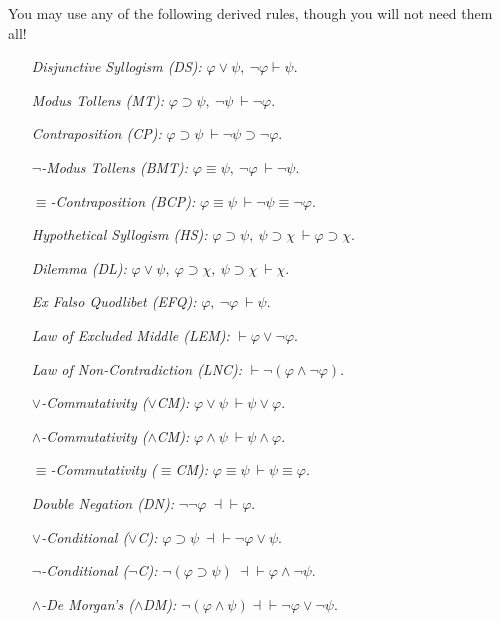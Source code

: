 \documentclass[12pt]{article}
\begin{document}
\noindent
You may use any of the following derived rules, though you will not need them all!

\bigskip

\begin{enumerate}[leftmargin=2.75in]
  \item[\it Disjunctive Syllogism \textsc{(DS):}] $\varphi \vee \psi,\ \neg \varphi \vdash \psi$.
  \item[\it Modus Tollens \textsc{(MT):}] $\varphi \supset \psi,\ \neg\psi\ \vdash \neg\varphi$.
  \item[\it Contraposition \textsc{(CP):}] $\varphi \supset \psi\ \vdash \neg\psi \supset \neg\varphi$.
  \item[\it $\neg$-Modus Tollens \textsc{(BMT):}] $\varphi \equiv \psi,\ \neg\varphi\ \vdash \neg\psi$.
  \item[\it $\equiv$-Contraposition \textsc{(BCP):}] $\varphi \equiv \psi\ \vdash \neg\psi \equiv \neg\varphi$.
  \item[\it Hypothetical Syllogism \textsc{(HS):}] $\varphi \supset \psi,\ \psi \supset \chi\ \vdash \varphi \supset \chi$.
  \item[\it Dilemma \textsc{(DL):}] $\varphi \vee \psi,\ \varphi \supset \chi,\ \psi \supset \chi\ \vdash \chi$.
  \item[\it Ex Falso Quodlibet \textsc{(EFQ):}] $\varphi,\ \neg\varphi\ \vdash \psi$.
  \item[\it Law of Excluded Middle \textsc{(LEM):}] $\vdash \varphi\vee\neg\varphi$.
  \item[\it Law of Non-Contradiction \textsc{(LNC):}] $\vdash \neg(\varphi\wedge\neg\varphi)$.
  \item[\it $\vee$-Commutativity \textsc{($\vee$CM):}] $\varphi \vee \psi\ \vdash \psi \vee \varphi$.
  \item[\it $\wedge$-Commutativity \textsc{($\wedge$CM):}] $\varphi \wedge \psi\ \vdash \psi \wedge \varphi$.
  \item[\it $\equiv$-Commutativity \textsc{($\equiv$CM):}] $\varphi \equiv \psi\ \vdash \psi \equiv \varphi$.
  \item[\it Double Negation \textsc{(DN):}] $\neg\neg\varphi\ \dashv\vdash \varphi$.
  \item[\it $\vee$-Conditional \textsc{($\vee$C):}] $\varphi \supset \psi\ \dashv\vdash \neg\varphi \vee \psi$.
  \item[\it $\neg$-Conditional \textsc{($\neg$C):}] $\neg(\varphi \supset \psi)\ \dashv\vdash \varphi \wedge \neg \psi$.
  \item[\it $\wedge$-De Morgan's \textsc{($\wedge$DM):}] $\neg(\varphi\wedge\psi)\dashv\vdash\neg\varphi\vee\neg\psi$.

\end{enumerate}
\end{document}
